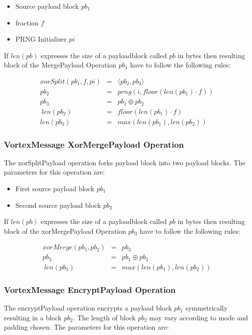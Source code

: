 \begin{itemize}
	\item Source payload block $pb_1$
	\item fraction $f$
	\item PRNG Initializer $pi$
\end{itemize}

If $len(pb)$ expresses the size of a payloadblock called $pb$ in bytes then resulting block of the MergePayload Operation $pb_3$ have to follow the following rules:

\begin{eqnarray}
xorSplit(pb_1, f, pi) & = & \langle pb_2,pb_3 \rangle \\
pb_2 & = & prng( i, floor(len(pb_1)\cdot f) )\\
pb_3 & = & pb_1 \oplus pb_2\\\
len(pb_2) & = & floor(len(pb_1)\cdot f)\\
len(pb_3) & = & max( len(pb_1), len(pb_2) )
\end{eqnarray}



\subsubsection{VortexMessage XorMergePayload Operation}
The xorSplitPayload operation forks payload block into two payload blocks. The parameters for this operation are:

\begin{itemize}
	\item First source payload block $pb_1$
	\item Second source payload block $pb_2$
\end{itemize}

If $len(pb)$ expresses the size of a payloadblock called $pb$ in bytes then resulting block of the xorMergePayload Operation $pb_3$ have to follow the following rules:

\begin{eqnarray}
xorMerge(pb_1, pb_2) & = & pb_3 \\
pb_3 & = & pb_1 \oplus pb_2\\\
len(pb_3) & = & max( len(pb_1), len(pb_2) )
\end{eqnarray}


\subsubsection{VortexMessage EncryptPayload Operation}
The encryptPayload operation encrypts a payload block $pb_1$ symmetrically resulting in a block $pb_2$. The length of block $pb_2$ may vary according to mode and padding chosen. The parameters for this operation are:

